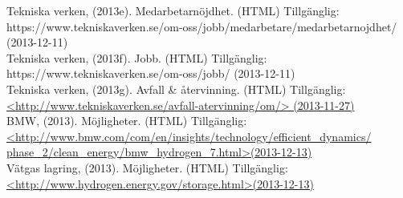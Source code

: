 \documentclass[10pt,a4paper]{article}
\begin{document}
Tekniska verken, (2013e). Medarbetarnöjdhet. (HTML) Tillgänglig: \\
https://www.tekniskaverken.se/om-oss/jobb/medarbetare/medarbetarnojdhet/ (2013-12-11)\\

Tekniska verken, (2013f). Jobb. (HTML) Tillgänglig: \\
https://www.tekniskaverken.se/om-oss/jobb/ (2013-12-11)\\

Tekniska verken, (2013g). Avfall \& återvinning. (HTML) Tillgänglig: \\
\hyperref{http://www.tekniskaverken.se/avfall-atervinning/om/}{}{}{<http://www.tekniskaverken.se/avfall-atervinning/om/> (2013-11-27)} \\


BMW, (2013). Möjligheter. (HTML) Tillgänglig: \\
\hyperref{http://www.bmw.com/com/en/insights/technology/efficient_dynamics/phase_2/clean_energy/bmw_hydrogen_7.html}{}{}{<http://www.bmw.com/com/en/insights/technology/efficient\_dynamics/\\phase\_2/clean\_energy/bmw\_hydrogen\_7.html>(2013-12-13)}\\

Vätgas lagring, (2013). Möjligheter. (HTML) Tillgänglig: \\
\hyperref{http://www.hydrogen.energy.gov/storage.html}{}{}{<http://www.hydrogen.energy.gov/storage.html>(2013-12-13)}\\
\end{document}
